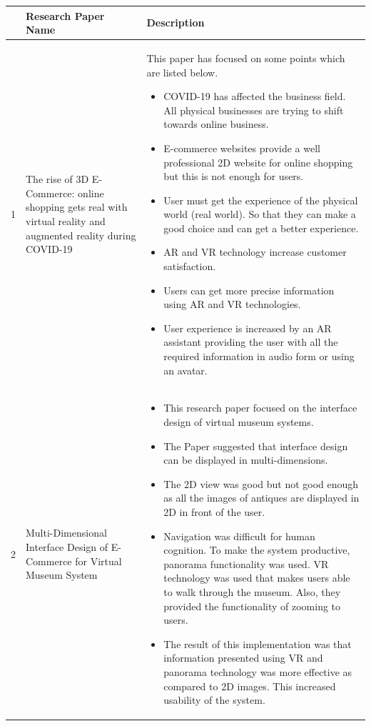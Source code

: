             \begin{center}
\begin{tabular}{ | m{1em} | m{5em} | m{10cm} | } 
 \hline
 \textbf{} & \textbf{Research Paper Name} &
 \textbf{Description}  \\  \hline
           1 & The rise of 3D E-Commerce: online shopping gets real with virtual reality and augmented reality during COVID-19 & This paper has focused on some points which are listed below.
\begin{itemize}
    \item COVID-19 has affected the business field. All physical businesses are trying to shift towards online business.

\item 	E-commerce websites provide a well professional 2D website for online shopping but this is not enough for users.
 \item 	User must get the experience of the physical world (real world). So that they can make a good choice and can get a better experience.
 \item 	AR and VR technology increase customer satisfaction.
 \item 	Users can get more precise information using AR and VR technologies.
 \item 	User experience is increased by an AR assistant providing the user with all the required information in audio form or using an avatar.\cite{3DECommerce}
\end{itemize}

         \\  \hline

          2 & Multi-Dimensional Interface Design of E-Commerce for Virtual Museum System &
         \begin{itemize}
    \item 
          This research paper focused on the interface design of virtual museum systems.  \item The Paper suggested that interface design can be displayed in multi-dimensions.  \item The 2D view was good but not good enough as all the images of antiques are displayed in 2D in front of the user.  \item Navigation was difficult for human cognition. To make the system productive, panorama functionality was used. VR technology was used that makes users able to walk through the museum. Also, they provided the functionality of zooming to users.
 \item The result of this implementation was that information presented using VR and panorama technology was more effective as compared to 2D images. This increased usability of the system.
 \end{itemize}
 \cite{Multi-dimensionaldesign}
         \\  \hline
              \end{tabular}
\end{center}
